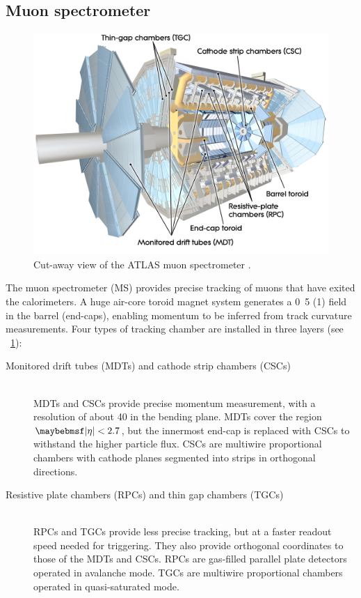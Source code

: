\clearpage
\subsection{Muon spectrometer}
\label{sec:atlas:ms}

\begin{figure}[t]
	\includegraphics[width=\largefigwidth]{tex/experiment/ms_whole}
	\caption{Cut-away view of the ATLAS muon spectrometer \cite{ATLAS-detector}.}
	\label{fig:muon_spectrometer}
\end{figure}

The muon spectrometer (MS) provides precise tracking of muons that have exited the 
calorimeters. A huge air-core toroid magnet system generates a \unit{0.5}{\tesla} 
(\unit{1}{\tesla}) field in the barrel (end-caps), enabling momentum to be inferred from 
track curvature measurements. Four types of tracking chamber are installed in three 
layers (see \Figure~\ref{fig:muon_spectrometer}):
\begin{description}
\item[Monitored drift tubes (MDTs) and cathode strip chambers (CSCs)] \hfill \\
	MDTs and CSCs provide precise momentum measurement, with a resolution of 
	about \unit{40}{\micro\metre} in the bending plane. MDTs cover the region 
	$\mods{\eta} < 2.7$, but the innermost end-cap is replaced with CSCs to 
	withstand the higher particle flux. CSCs are multiwire proportional chambers 
	with cathode planes segmented into strips in orthogonal directions.
\item[Resistive plate chambers (RPCs) and thin gap chambers (TGCs)] \hfill \\
	RPCs and TGCs provide less precise tracking, but at a faster readout speed needed for 
	triggering. They also provide orthogonal coordinates to those of the MDTs and CSCs. 
	RPCs are gas-filled parallel plate detectors operated in avalanche mode.
	TGCs are multiwire proportional chambers operated in quasi-saturated mode.
\end{description}




